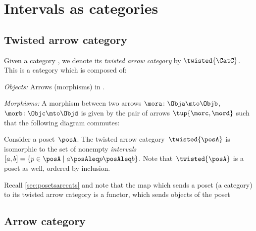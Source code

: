 \section{Intervals as categories}
\subsection{Twisted arrow category}
\begin{ctdefinition}
  \label{def:twisted-arrow}
  Given a category \CatC, we denote its \emph{twisted arrow category} by $\twisted{\CatC}$. This is a category which is composed of:
  \begin{compactenum}
    \item \emph{Objects:} Arrows (morphisms) in \CatC.
    \item \emph{Morphisms:} A morphism between two arrows $\mora\colon \Obja \mto \Objb $, $\morb\colon \Objc \mto \Objd$ is given by the pair of arrows $\tup{\morc,\mord}$ such that the following diagram commutes:
    \begin{center}
    \end{center}
  \end{compactenum}
\end{ctdefinition}



\begin{example}[Intervals]
  Consider a poset~$\posA$. The twisted arrow category~$\twisted{\posA}$ is isomorphic to the set of nonempty \emph{intervals}~$[a,b]=\{p \in \posA \mid a\posAleq p \posAleq b\}$. Note that~$\twisted{\posA}$ is a poset as well, ordered by inclusion.
\end{example}
\begin{remark}
  Recall \cref{sec:posetsarecats} and note that the map which sends a poset (a category) to its twisted arrow category is a functor, which sends objects of the poset
\end{remark}

\subsection{Arrow category}

